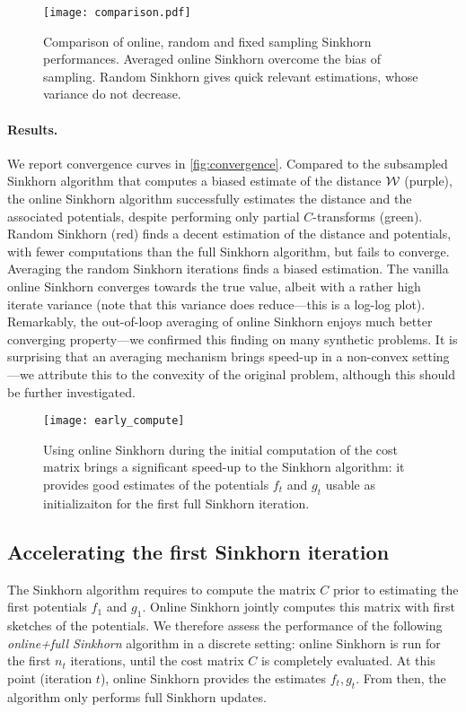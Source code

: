 \begin{figure}[t]
    \centering
    \texttt{[image: comparison.pdf]}
    \caption{Comparison of online, random and fixed sampling Sinkhorn performances. Averaged online Sinkhorn overcome the bias of sampling. Random Sinkhorn gives quick relevant estimations, whose variance do not decrease.}
    \label{fig:convergence}
\end{figure}

\paragraph{Results.} We report convergence curves in \autoref{fig:convergence}.
Compared to the subsampled Sinkhorn algorithm that computes a biased estimate of
the distance $\mathcal{W}$ (purple), the online Sinkhorn algorithm successfully
estimates the distance and the associated potentials, despite performing only
partial $C$-transforms (green). Random Sinkhorn (red) finds a decent estimation
of the distance and potentials, with fewer computations than the full Sinkhorn
algorithm, but fails to converge. Averaging the random Sinkhorn iterations finds
a biased estimation. The vanilla online Sinkhorn converges towards the true
value, albeit with a rather high iterate variance (note that this variance does
reduce---this is a log-log plot). Remarkably, the out-of-loop averaging of
online Sinkhorn enjoys much better converging property---we confirmed this
finding on many synthetic problems. It is surprising that an averaging mechanism
brings speed-up in a non-convex setting---we attribute this to the convexity of
the original problem, although this should be further investigated.

\begin{figure}[t]
    \centering
    \texttt{[image: early\_compute]}
    \caption{Using online Sinkhorn during the initial computation of the cost
     matrix brings a significant speed-up to the Sinkhorn algorithm: it provides
     good estimates of the potentials $f_t$ and $g_t$ usable as initializaiton
     for the first full Sinkhorn iteration.\label{fig:early_compute}}
\end{figure}

\subsection{Accelerating the first Sinkhorn iteration}\label{sec:accelerating}

The Sinkhorn algorithm requires to compute the matrix $C$ prior to estimating
the first potentials $f_1$ and $g_1$. Online Sinkhorn jointly computes this
matrix with first sketches of the potentials. We therefore assess the
performance of the following \textit{online+full Sinkhorn} algorithm in a
discrete setting: online Sinkhorn is run for the first $n_t$ iterations, until
the cost matrix $C$ is completely evaluated. At this point (iteration $t$),
online Sinkhorn provides the estimates $f_{t}, g_{t}$. From then, the algorithm
only performs full Sinkhorn updates.

